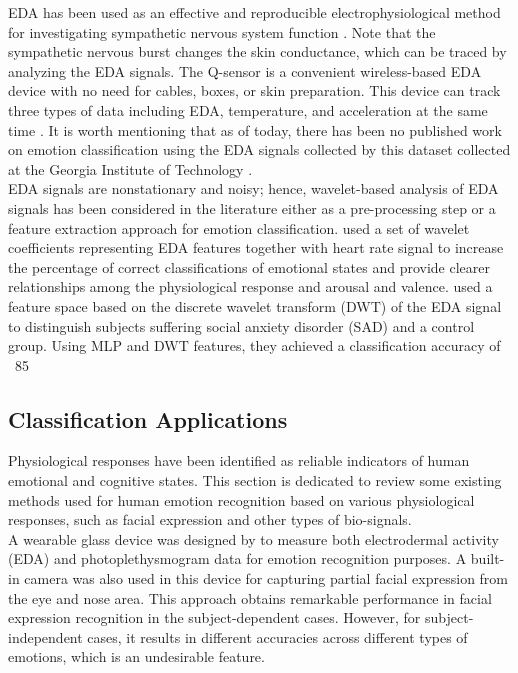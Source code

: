 EDA has been used as an effective and reproducible electrophysiological method for 
investigating sympathetic nervous system function \cite{WearableDevice2016, AssociationBetween2013, SympatheticSkin1984, PrincipalComponent2000}. Note that the sympathetic nervous 
burst changes the skin conductance, which can be traced by analyzing the EDA signals\cite{SkinConduct2006, SympatheticSkin1981, DecodeChild2013}. The Q-sensor 
is a convenient wireless-based EDA device with no need for cables, boxes, or skin 
preparation. This device can track three types of data including EDA, temperature, 
and acceleration at the same time \cite{Validation2013}. It is worth mentioning that 
as of today, there has been no published work on emotion classification using the 
EDA signals collected by this dataset collected at the Georgia Institute of 
Technology \cite{DecodeChild2013}.\\

EDA signals are nonstationary and noisy; hence, wavelet-based analysis of EDA signals 
has been considered in the literature \cite{EmotionalState2013, EMGGSR2009}
either as a pre-processing step or a feature extraction approach for emotion classification. 
\cite{EmotionalState2013} used a set of wavelet coefficients representing EDA features 
together with heart rate signal to increase the percentage of correct classifications 
of emotional states and provide clearer relationships among the physiological response 
and arousal and valence. \cite{EDA2016} used a feature space based on the 
discrete wavelet transform (DWT) of the EDA signal to distinguish subjects suffering 
social anxiety disorder (SAD) and a control group. Using MLP and DWT features, they 
achieved a classification accuracy of ~85%

\subsection{Classification Applications}
Physiological responses have been identified as reliable indicators of human emotional 
and cognitive states. This section is dedicated to review some existing methods used for 
human emotion recognition based on various physiological responses, such as facial 
expression and other types of bio-signals. \\

A wearable glass device was designed by \cite{WearableDevice2016} to measure both electrodermal 
activity (EDA) and photoplethysmogram data for emotion recognition purposes. A built-in 
camera was also used in this device for capturing partial facial expression from the eye 
and nose area. This approach obtains remarkable performance in facial expression 
recognition in the subject-dependent cases. However, for subject-independent cases, 
it results in different accuracies across different types of emotions, which is an 
undesirable feature. \\

